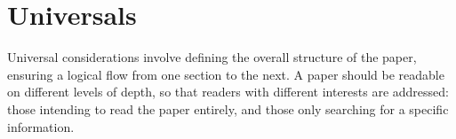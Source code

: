 
\chapter{Universals}
\label{ch:universals}

Universal considerations involve defining the overall structure of the paper, ensuring a logical flow from one section to the next.
A paper should be readable on different levels of depth, so that readers with different interests are addressed:
those intending to read the paper entirely, and those only searching for a specific information.





